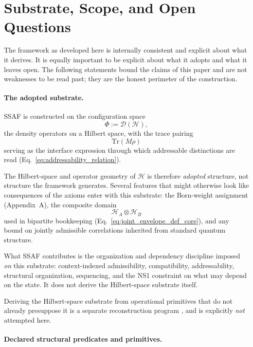 \documentclass[aps,prx,onecolumn,11pt]{revtex4-2}
\theoremstyle{plain}
\theoremstyle{definition}
\theoremstyle{remark}
\begin{document}
\section{Substrate, Scope, and Open Questions}
\label{sec:substrate_scope_open}

The framework as developed here is internally consistent and explicit
about what it derives. It is equally important to be explicit about what
it adopts and what it leaves open. The following statements bound the
claims of this paper and are not weaknesses to be read past; they are
the honest perimeter of the construction.

\paragraph{The adopted substrate.}

SSAF is constructed on the configuration space
\[
\Phi := \mathcal{D}(\mathcal{H}),
\]
the density operators on a Hilbert space, with the trace pairing
\[
\mathrm{Tr}(M\rho)
\]
serving as the interface expression through which addressable
distinctions are read
(Eq.~\ref{eq:addressability_relation}).

The Hilbert-space and operator geometry of \(\mathcal H\) is therefore
\emph{adopted} structure, not structure the framework generates.
Several features that might otherwise look like consequences of the
axioms enter with this substrate: the Born-weight assignment
(Appendix~A), the composite domain
\[
\mathcal{H}_A\otimes\mathcal{H}_B
\]
used in bipartite bookkeeping
(Eq.~\ref{eq:joint_envelope_def_core}), and any bound on jointly
admissible correlations inherited from standard quantum structure.

What SSAF contributes is the organization and dependency discipline
imposed \emph{on} this substrate: context-indexed admissibility,
compatibility, addressability, structural organization, sequencing, and
the NS1 constraint on what may depend on the state. It does not derive
the Hilbert-space substrate itself.

Deriving the Hilbert-space substrate from operational primitives that do
not already presuppose it is a separate reconstruction program
\cite{Hardy2001,Chiribella2010,MasanesMuller2011}, and is explicitly
\emph{not} attempted here.

\paragraph{Declared structural predicates and primitives.}
\end{document}
